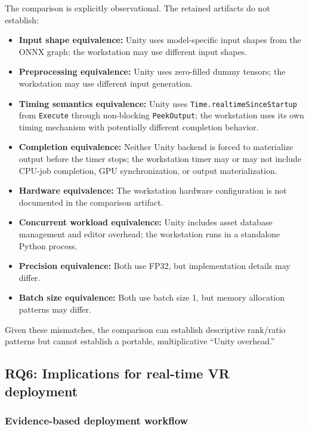 \documentclass[10pt,twocolumn]{article}
\begin{document}
The comparison is explicitly observational. The retained artifacts do not establish:
\begin{itemize}[nosep,leftmargin=*]
  \item \textbf{Input shape equivalence:} Unity uses model-specific input shapes from the ONNX graph; the workstation may use different input shapes.
  \item \textbf{Preprocessing equivalence:} Unity uses zero-filled dummy tensors; the workstation may use different input generation.
  \item \textbf{Timing semantics equivalence:} Unity uses \texttt{Time.realtimeSinceStartup} from \texttt{Execute} through non-blocking \texttt{PeekOutput}; the workstation uses its own timing mechanism with potentially different completion behavior.
  \item \textbf{Completion equivalence:} Neither Unity backend is forced to materialize output before the timer stops; the workstation timer may or may not include CPU-job completion, GPU synchronization, or output materialization.
  \item \textbf{Hardware equivalence:} The workstation hardware configuration is not documented in the comparison artifact.
  \item \textbf{Concurrent workload equivalence:} Unity includes asset database management and editor overhead; the workstation runs in a standalone Python process.
  \item \textbf{Precision equivalence:} Both use FP32, but implementation details may differ.
  \item \textbf{Batch size equivalence:} Both use batch size 1, but memory allocation patterns may differ.
\end{itemize}

Given these mismatches, the comparison can establish descriptive rank/ratio patterns but cannot establish a portable, multiplicative ``Unity overhead.''

\subsection{RQ6: Implications for real-time VR deployment}\label{sec:rq6}

\subsubsection{Evidence-based deployment workflow}
\end{document}

